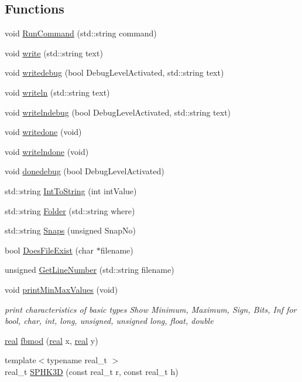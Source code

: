 \subsection*{Functions}
\begin{DoxyCompactItemize}
\item 
void \hyperlink{Global_8h_af14ce9adc079d3106f6fe5ed977660a9}{RunCommand} (std::string command)
\item 
void \hyperlink{Global_8h_aadd6ff8eac457116cc843c4b98bc0636}{write} (std::string text)
\item 
void \hyperlink{Global_8h_a865c3c98145e9535ae7575ff0161119d}{writedebug} (bool DebugLevelActivated, std::string text)
\item 
void \hyperlink{Global_8h_a37de7b6ae4852c4084f30507d58eb906}{writeln} (std::string text)
\item 
void \hyperlink{Global_8h_a5b25522225f9cc3d16b32059a125a93e}{writelndebug} (bool DebugLevelActivated, std::string text)
\item 
void \hyperlink{Global_8h_a90a26977d0e79592478299043e94091e}{writedone} (void)
\item 
void \hyperlink{Global_8h_a6ea51689681a48365e4852a63687b8e6}{writelndone} (void)
\item 
void \hyperlink{Global_8h_a537260c4c4c2057809ee9ca92cf460c7}{donedebug} (bool DebugLevelActivated)
\item 
std::string \hyperlink{Global_8h_a3d2b4d4a9d8d164a3fdea80bfc1ea93d}{IntToString} (int intValue)
\item 
std::string \hyperlink{Global_8h_ad3867aaa410297f271cb4a5f443f368c}{Folder} (std::string where)
\item 
std::string \hyperlink{Global_8h_ab95a6a07eed667f94b0951a15f1a9b0e}{Snaps} (unsigned SnapNo)
\item 
bool \hyperlink{Global_8h_a1c4c7d9ff8a31be4d5076c817d1297e3}{DoesFileExist} (char $\ast$filename)
\item 
unsigned \hyperlink{Global_8h_a5cf7528ff238e0f7be1d86289650f04e}{GetLineNumber} (std::string filename)
\item 
void \hyperlink{Global_8h_a51dd29892ba6b6ec3e4075d2016d796a}{printMinMaxValues} (void)
\begin{DoxyCompactList}\small\item\em print characteristics of basic types Show Minimum, Maximum, Sign, Bits, Inf for bool, char, int, long, unsigned, unsigned long, float, double \item\end{DoxyCompactList}\item 
\hyperlink{Global_8h_a031f8951175b43076c2084a6c2173410}{real} \hyperlink{Global_8h_aa92971b06497e2333e4bc532a86297cb}{fbmod} (\hyperlink{Global_8h_a031f8951175b43076c2084a6c2173410}{real} x, \hyperlink{Global_8h_a031f8951175b43076c2084a6c2173410}{real} y)
\item 
{\footnotesize template$<$typename real\_\-t $>$ }\\real\_\-t \hyperlink{Global_8h_a0cb8e9ba7bd0b1861c15a42aa799dcd4}{SPHK3D} (const real\_\-t r, const real\_\-t h)
\end{DoxyCompactItemize}
